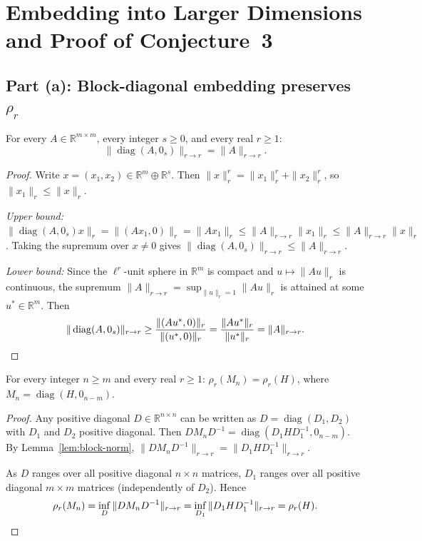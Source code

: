 \section{Embedding into Larger Dimensions and Proof of Conjecture~3}

\subsection*{Part (a): Block-diagonal embedding preserves $\rho_r$}

\begin{lemma}\label{lem:block-norm}
For every $A\in\mathbb{R}^{m\times m}$, every integer $s \geq 0$, and every real $r \geq 1$:
\[
\|\operatorname{diag}(A, 0_s)\|_{r\to r} = \|A\|_{r\to r}.
\]
\end{lemma}

\begin{proof}
Write $x = (x_1, x_2) \in \mathbb{R}^m \oplus \mathbb{R}^s$. Then $\|x\|_r^r = \|x_1\|_r^r + \|x_2\|_r^r$, so $\|x_1\|_r \leq \|x\|_r$.

\textit{Upper bound:} $\|\operatorname{diag}(A,0_s)x\|_r = \|(Ax_1, 0)\|_r = \|Ax_1\|_r \leq \|A\|_{r\to r}\|x_1\|_r \leq \|A\|_{r\to r}\|x\|_r$. Taking the supremum over $x \neq 0$ gives $\|\operatorname{diag}(A,0_s)\|_{r\to r} \leq \|A\|_{r\to r}$.

\textit{Lower bound:} Since the $\ell^r$-unit sphere in $\mathbb{R}^m$ is compact and $u \mapsto \|Au\|_r$ is continuous, the supremum $\|A\|_{r\to r} = \sup_{\|u\|_r=1}\|Au\|_r$ is attained at some $u^* \in \mathbb{R}^m$. Then
\[
\|\operatorname{diag}(A,0_s)\|_{r\to r} \geq \frac{\|(Au^*, 0)\|_r}{\|(u^*, 0)\|_r} = \frac{\|Au^*\|_r}{\|u^*\|_r} = \|A\|_{r\to r}. \qedhere
\]
\end{proof}

\begin{proposition}
For every integer $n \geq m$ and every real $r \geq 1$: $\rho_r(M_n) = \rho_r(H)$, where $M_n = \operatorname{diag}(H, 0_{n-m})$.
\end{proposition}

\begin{proof}
Any positive diagonal $D \in \mathbb{R}^{n\times n}$ can be written as $D = \operatorname{diag}(D_1, D_2)$ with $D_1$ and $D_2$ positive diagonal. Then $DM_nD^{-1} = \operatorname{diag}(D_1HD_1^{-1}, 0_{n-m})$. By Lemma~\ref{lem:block-norm}, $\|DM_nD^{-1}\|_{r\to r} = \|D_1HD_1^{-1}\|_{r\to r}$.

As $D$ ranges over all positive diagonal $n\times n$ matrices, $D_1$ ranges over all positive diagonal $m\times m$ matrices (independently of $D_2$). Hence
\[
\rho_r(M_n) = \inf_D \|DM_nD^{-1}\|_{r\to r} = \inf_{D_1} \|D_1HD_1^{-1}\|_{r\to r} = \rho_r(H). \qedhere
\]
\end{proof}

